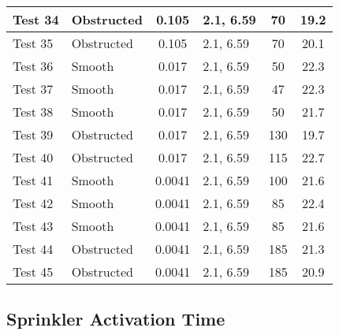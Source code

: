 \begin{table}[!h]
\begin{center}
\begin {tabular}{|l|l|c|l|c|c|}
Test 34    &  Obstructed    &  0.105            &  2.1, 6.59  &  70              &  19.2              \\ \hline
Test 35    &  Obstructed    &  0.105            &  2.1, 6.59  &  70              &  20.1              \\ \hline
Test 36    &  Smooth        &  0.017            &  2.1, 6.59  &  50              &  22.3              \\ \hline
Test 37    &  Smooth        &  0.017            &  2.1, 6.59  &  47              &  22.3              \\ \hline
Test 38    &  Smooth        &  0.017            &  2.1, 6.59  &  50              &  21.7              \\ \hline
Test 39    &  Obstructed    &  0.017            &  2.1, 6.59  &  130             &  19.7              \\ \hline
Test 40    &  Obstructed    &  0.017            &  2.1, 6.59  &  115             &  22.7              \\ \hline
Test 41    &  Smooth        &  0.0041           &  2.1, 6.59  &  100             &  21.6              \\ \hline
Test 42    &  Smooth        &  0.0041           &  2.1, 6.59  &  85              &  22.4              \\ \hline
Test 43    &  Smooth        &  0.0041           &  2.1, 6.59  &  85              &  21.6              \\ \hline
Test 44    &  Obstructed    &  0.0041           &  2.1, 6.59  &  185             &  21.3              \\ \hline
Test 45    &  Obstructed    &  0.0041           &  2.1, 6.59  &  185             &  20.9              \\ \hline
\end{tabular}
\end{center}
\end{table}


\clearpage


\subsection*{Sprinkler Activation Time}

